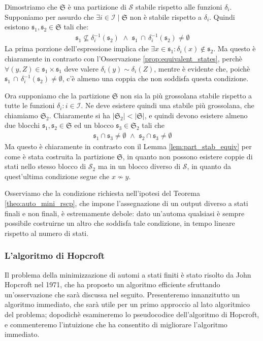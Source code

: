 \begin{proof2}
    Dimostriamo che $\mathfrak{S}$ è una partizione di $\mathcal{S}$ stabile rispetto alle funzioni $\delta_i$. Supponiamo per assurdo che $\exists i \in \mathcal{I} \mid \mathfrak{S}$ non è stabile rispetto a $\delta_i$. Quindi esistono $\mathfrak{s}_1, \mathfrak{s}_2 \in \mathfrak{S}$ tali che:
    \begin{gather*}
        \mathfrak{s}_1 \not\subseteq \delta_i^{-1}(\mathfrak{s}_2) \,\, \land \,\, \mathfrak{s}_1 \,\cap \,\delta_i^{-1}(\mathfrak{s}_2) \neq \emptyset
    \end{gather*}
    La prima porzione dell'espressione implica che $\exists x \in \mathfrak{s}_1 : \delta_i(x) \not\in \mathfrak{s}_2$. Ma questo è chiaramente in contrasto con l'Osservazione \ref{prop:equivalent_states}, perchè $\forall (y,Z) \in \mathfrak{s}_1 \times \mathfrak{s}_1$ deve valere $\delta_i(y) \sim \delta_i(Z)$, mentre è evidente che, poichè $\mathfrak{s}_1 \,\cap\, \delta_i^{-1}(\mathfrak{s}_2) \neq \emptyset$, c'è almeno una coppia che non soddisfa questa condizione.

    Ora supponiamo che la partizione $\mathfrak{S}$ non sia la più grossolana stabile rispetto a tutte le funzioni $\delta_i : i \in \mathcal{I}$. Ne deve esistere quindi una stabile più grossolana, che chiamiamo $\mathfrak{S}_2$. Chiaramente si ha $|\mathfrak{S}_2| < |\mathfrak{S}|$, e quindi devono esistere almeno due blocchi $\mathfrak{s}_1, \mathfrak{s}_2 \in \mathfrak{S}$ ed un blocco $\mathfrak{s}_3 \in \mathfrak{S}_2$ tali che
    \begin{gather*}
        \mathfrak{s}_1 \cap \mathfrak{s}_3 \neq \emptyset \,\,\land\,\, \mathfrak{s}_2 \cap \mathfrak{s}_3 \neq \emptyset
    \end{gather*}
    Ma questo è chiaramente in contrasto con il Lemma \ref{lem:part_stab_equiv} per come è stata costruita la partizione $\mathfrak{S}$, in quanto non possono esistere coppie di stati nello stesso blocco di $\mathcal{S}_2$ ma in un blocco diverso di $\mathcal{S}$, in quanto da quest'ultima condizione segue che $x \not\sim y$.
\end{proof2}
Osserviamo che la condizione richiesta nell'ipotesi del Teorema \ref{theo:auto_mini_rscp}, che impone l'assegnazione di un output diverso a stati finali e non finali, è estremamente debole: dato un'automa qualsiasi è sempre possibile costruirne un altro che soddisfa tale condizione, in tempo lineare rispetto al numero di stati.

\subsubsection{L'algoritmo di Hopcroft}
Il problema della minimizzazione di automi a stati finiti è stato risolto da John Hopcroft nel 1971, che ha proposto un algoritmo efficiente sfruttando un'osservazione che sarà discussa nel seguito. Presenteremo innanzitutto un algoritmo immediato, che sarà utile per un primo approccio al lato algoritmico del problema; dopodichè esamineremo lo pseudocodice dell'algoritmo di Hopcroft, e commenteremo l'intuizione che ha consentito di migliorare l'algoritmo immediato.

